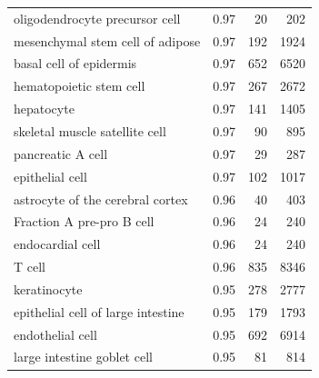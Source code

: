 \begin{table}[pht!]
\begin{tabular}{lrrr}
  oligodendrocyte precursor cell & 0.97 &  20 & 202 \\ 
  mesenchymal stem cell of adipose & 0.97 & 192 & 1924 \\ 
  basal cell of epidermis & 0.97 & 652 & 6520 \\ 
  hematopoietic stem cell & 0.97 & 267 & 2672 \\ 
  hepatocyte & 0.97 & 141 & 1405 \\ 
  skeletal muscle satellite cell & 0.97 &  90 & 895 \\ 
  pancreatic A cell & 0.97 &  29 & 287 \\ 
  epithelial cell & 0.97 & 102 & 1017 \\ 
  astrocyte of the cerebral cortex & 0.96 &  40 & 403 \\ 
  Fraction A pre-pro B cell & 0.96 &  24 & 240 \\ 
  endocardial cell & 0.96 &  24 & 240 \\ 
  T cell & 0.96 & 835 & 8346 \\ 
  keratinocyte & 0.95 & 278 & 2777 \\ 
  epithelial cell of large intestine & 0.95 & 179 & 1793 \\ 
  endothelial cell & 0.95 & 692 & 6914 \\ 
  large intestine goblet cell & 0.95 &  81 & 814 \\ 
   \bottomrule
\end{tabular}
\end{table}


